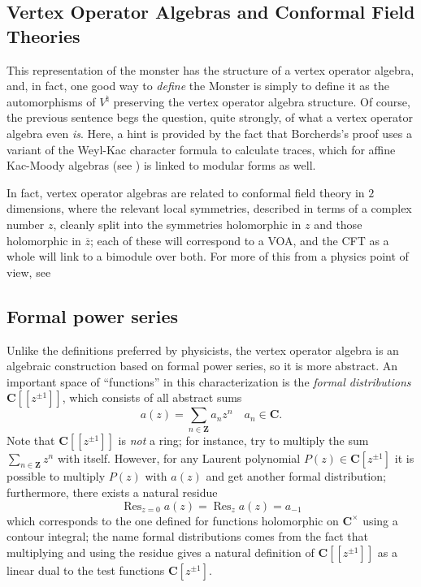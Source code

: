\documentclass{article}
\newcommand{\CC}{\mathbold{C}}
\newcommand{\ZZ}{\mathbold{Z}}
\DeclareMathOperator{\Res}{Res}
\begin{document}
\subsection{Vertex Operator Algebras and Conformal Field Theories}
This representation of the monster has the structure of a vertex operator algebra, and, in fact, one good way to \textit{define} the Monster is simply to define it as the automorphisms of $V^\natural$ preserving the vertex operator algebra structure.  Of course, the previous sentence begs the question, quite strongly, of what a vertex operator algebra even \textit{is}.  Here, a hint is provided by the fact that Borcherds's proof uses a variant of the Weyl-Kac character formula to calculate traces, which for affine Kac-Moody algebras (see \cite{MR1104219}) is linked to modular forms as well.

In fact, vertex operator algebras are related to conformal field theory in $2$ dimensions, where the relevant local symmetries, described in terms of a complex number $z$, cleanly split into the symmetries holomorphic in $z$ and those holomorphic in $\overline{z}$; each of these will correspond to a VOA, and the CFT as a whole will link to a bimodule over both.  For more of this from a physics point of view, see \cite{2005hep.th....9027G}

\subsection{Formal power series}
\label{sec:formalpow}

Unlike the definitions preferred by physicists, the vertex operator algebra is an algebraic construction based on formal power series, so it is more abstract.  An important space of ``functions'' in this characterization is the \textit{formal distributions} $\CC[[z^{\pm 1}]]$, which consists of all abstract sums
\[a(z)=\sum_{n \in \ZZ} a_n z^n \quad a_n \in \CC. \]
Note that $\CC[[z^{\pm 1}]]$ is \textit{not} a ring; for instance, try to multiply the sum $\sum_{n \in \ZZ} z^n$ with itself.  However, for any Laurent polynomial $P(z) \in \CC[z^{\pm 1}]$ it is possible to multiply $P(z)$ with $a(z)$ and get another formal distribution; furthermore, there exists a natural residue
\[\Res_{z=0} a(z)=\Res_z a(z)=a_{-1} \]
which corresponds to the one defined for functions holomorphic on $\CC^\times$ using a contour integral; the name formal distributions comes from the fact that multiplying and using the residue gives a natural definition of $\CC[[z^{\pm 1}]]$ as a linear dual to the test functions $\CC[z^{\pm 1}]$.
\end{document}
